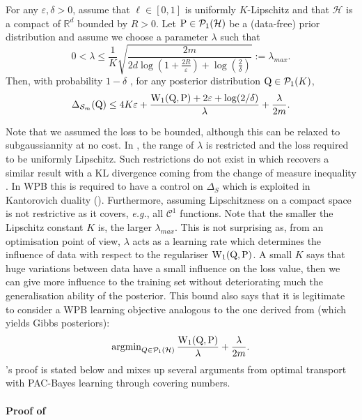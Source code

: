 \begin{theorem}
\label{th: compact_catoni}
For any $\varepsilon,\delta>0$, assume that $\ell\in [0,1]$ is uniformly $K$-Lipschitz and that $\mathcal{H}$ is a compact of $\mathbb{R}^d$ bounded by $R>0$. Let $\P\in \mathcal{P}_1(\mathcal{H})$ be a (data-free) prior distribution and assume we choose a parameter $\lambda$ such that
\[ 0< \lambda \leq  \frac{1}{K}\sqrt{\frac{2m}{2d\log(1+\frac{2R}{\varepsilon})+\log(\frac{2}{\delta})}}:= \lambda_{max}. \]
Then, with probability $1-\delta$ , for any posterior distribution $\Q\in\mathcal{P}_1(K)$,
\[ \Delta_{\Sm}(\Q) \leq 4K\varepsilon + \frac{\W_{1}(\Q,\P)+2\varepsilon +\log(2/\delta)}{\lambda} + \frac{\lambda}{2m}.   \]
\end{theorem}
Note that we assumed the loss to be bounded, although this can be relaxed to subgaussiannity at no cost.
In , the range of $\lambda$ is restricted and the loss required to be uniformly Lipschitz. Such restrictions do not exist in \citet[Theorem 4.1]{alquier2016properties} which recovers a similar result with a KL divergence coming from the change of measure inequality \citep{donsker1976asymp}. In WPB this is required to have a control on $\Delta_S$ which is exploited in Kantorovich duality ().
Furthermore, assuming Lipschitzness on a compact space is not restrictive as it covers, \emph{e.g.}, all $\mathcal{C}^1$ functions.
Note that the smaller the Lipschitz constant $K$ is, the larger $\lambda_{max}$.
This is not surprising as, from an optimisation point of view, $\lambda$ acts as a learning rate which determines the influence of data with respect to the regulariser $\W_{1}(\Q,\P)$.
A small $K$ says that huge variations between data have a small influence on the loss value, then we can give more influence to the training set without deteriorating much the generalisation ability of the posterior.
This bound also says that it is legitimate to consider a WPB learning objective analogous to the one derived from \citet[Theorem 4.1]{alquier2016properties} (which yields Gibbs posteriors):
$$\operatorname{argmin}_{Q\in\mathcal{P}_1(\mathbb{\mathcal{H}})}\frac{\W_{1}(\Q,\P)}{\lambda} + \frac{\lambda}{2m}.$$
's proof is stated below and mixes up several arguments from optimal transport with PAC-Bayes learning through covering numbers.
\paragraph{Proof of }


